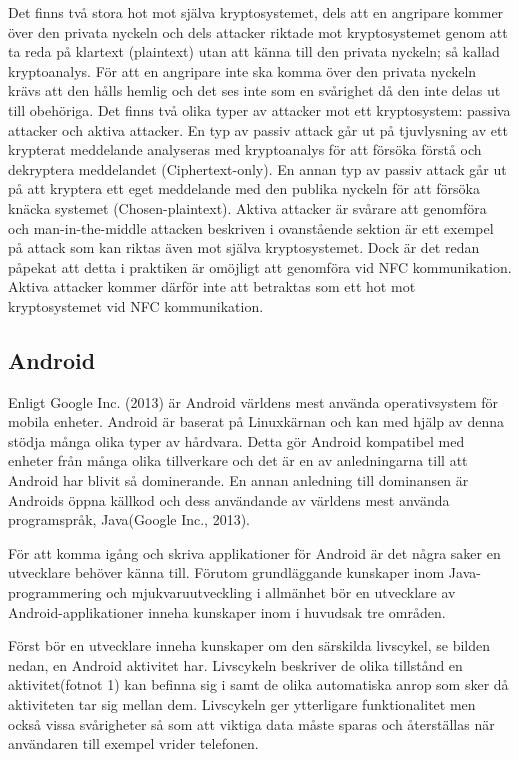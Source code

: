 \documentclass[11pt]{article}
\begin{document}
Det finns två stora hot mot själva kryptosystemet, dels att en angripare kommer över den privata nyckeln och dels attacker riktade mot kryptosystemet genom att ta reda på klartext (plaintext) utan att känna till den privata nyckeln; så kallad kryptoanalys. För att en angripare inte ska komma över den privata nyckeln krävs att den hålls hemlig och det ses inte som en svårighet då den inte delas ut till obehöriga. Det finns två olika typer av attacker mot ett kryptosystem: passiva attacker och aktiva attacker. En typ av passiv attack går ut på tjuvlysning av ett krypterat meddelande analyseras med kryptoanalys för att försöka förstå och dekryptera meddelandet (Ciphertext-only). En annan typ av passiv attack går ut på att kryptera ett eget meddelande med den publika nyckeln för att försöka knäcka systemet (Chosen-plaintext). Aktiva attacker är svårare att genomföra och man-in-the-middle attacken beskriven i ovanstående sektion är ett exempel på attack som kan riktas även mot själva kryptosystemet. Dock är det redan påpekat att detta i praktiken är omöjligt att genomföra vid NFC kommunikation. Aktiva attacker kommer därför inte att betraktas som ett hot mot kryptosystemet vid NFC kommunikation.


\subsection{Android}
Enligt Google Inc. (2013) är Android världens mest använda operativsystem för mobila enheter. Android är baserat på Linuxkärnan och kan med hjälp av denna stödja många olika typer av hårdvara. Detta gör Android kompatibel med enheter från många olika tillverkare och det är en av anledningarna till att Android har blivit så dominerande. En annan anledning till dominansen är Androids öppna källkod och dess användande av världens mest använda programspråk, Java(Google Inc., 2013).

För att komma igång och skriva applikationer för Android är det några saker en utvecklare behöver känna till. Förutom grundläggande kunskaper inom Java-programmering och mjukvaruutveckling i allmänhet bör en utvecklare av Android-applikationer inneha kunskaper inom i huvudsak tre områden.

Först bör en utvecklare inneha kunskaper om den särskilda livscykel, se bilden nedan, en Android aktivitet har. Livscykeln beskriver de olika tillstånd en aktivitet(fotnot 1) kan befinna sig i samt de olika automatiska anrop som sker då aktiviteten tar sig mellan dem. Livscykeln ger ytterligare funktionalitet men också vissa svårigheter så som att viktiga data måste sparas och återställas när användaren till exempel vrider telefonen.
\end{document}
